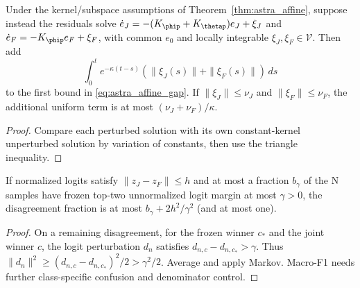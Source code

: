 \begin{proposition}
\label{prop:astra_robust}
Under the kernel/subspace assumptions of Theorem~\ref{thm:astra_affine},
suppose instead the residuals solve
$\dot e_J=-(K_\phip+K_\thetap)e_J+\xi_J$ and
$\dot e_F=-K_\phip e_F+\xi_F$, with common $e_0$ and locally
integrable $\xi_J,\xi_F\in\mathcal V$. Then add
\[
 \int_0^t e^{-\kappa(t-s)}(\|\xi_J(s)\|+\|\xi_F(s)\|)\,ds
\]
to the first bound in \eqref{eq:astra_affine_gap}. If
$\|\xi_J\|\le\nu_J$ and $\|\xi_F\|\le\nu_F$, the additional
uniform term is at most $(\nu_J+\nu_F)/\kappa$.
\end{proposition}
\begin{proof}
Compare each perturbed solution with its own constant-kernel unperturbed
solution by variation of constants, then use the triangle inequality.
\end{proof}

\begin{proposition}
\label{prop:astra_margins}
If normalized logits satisfy $\|z_J-z_F\|\le h$ and at most a fraction
$b_\gamma$ of the N samples have frozen top-two unnormalized logit
margin at most $\gamma>0$, the disagreement fraction is at most
$b_\gamma+2h^2/\gamma^2$ (and at most one).
\end{proposition}
\begin{proof}
On a remaining disagreement, for the frozen winner $c_*$ and the joint
winner $c$, the logit perturbation $d_n$ satisfies
$d_{n,c}-d_{n,c_*}>\gamma$. Thus
$\|d_n\|^2\ge(d_{n,c}-d_{n,c_*})^2/2>\gamma^2/2$.
Average and apply Markov. Macro-F1 needs further class-specific
confusion and denominator control.
\end{proof}
